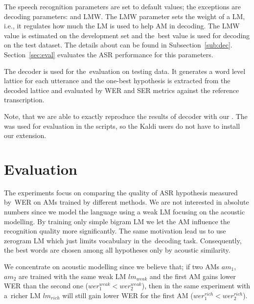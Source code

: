 The speech recognition parameters are set to default values; the exceptions are decoding parameters:  and \acl{LMW}. 
The \ac{LMW} parameter sets the weight of a \ac{LM}, i.e., it regulates how much the \ac{LM} is used to help \ac{AM} in decoding. 
The \ac{LMW} value is estimated on the development set and the~best value is used for decoding on the test dataset.
The details about  can be found in Subsection~\ref{sub:dec}.
Section~\ref{sec:eval} evaluates the \ac{ASR} performance for this parameters.

The  decoder is used for the~evaluation on testing data.
It generates a word level lattice for each utterance and the one-best hypothesis is extracted from the decoded lattice and evaluated by \ac{WER} and \ac{SER} metrics against the reference transcription.

Note, that we are able to exactly reproduce the results of  decoder with our .
The  was used for evaluation in the scripts, so the Kaldi users do not have to install our extension.

\section{Evaluation}
\label{sec:am_eval}

The experiments focus on comparing the quality of ASR hypothesis measured by~\ac{WER} on \acp{AM} trained by different methods.
We are not interested in absolute numbers since we model the language using a weak \ac{LM} focusing on the acoustic modelling.
By training only simple bigram \ac{LM} we let the \ac{AM} influence the recognition quality more significantly. 
The same motivation lead us to use zerogram \ac{LM} which just limits vocabulary in the~decoding task. %
Consequently, the best words are chosen among all hypotheses only by acoustic similarity.

We concentrate on acoustic modelling since we believe that; if two \acp{AM} $am_1$, $am_2$ are trained with the same weak \acl{LM} $lm_{weak}$ and the first \ac{AM} gains lower \ac{WER} than the second one ($wer^{weak}_{1} <  wer^{weak}_{2}$), then in the same experiment with a~richer \ac{LM} $lm_{rich}$ will still gain lower \ac{WER} for the first \ac{AM} ($wer^{rich}_{1} <  wer^{rich}_{2}$).

